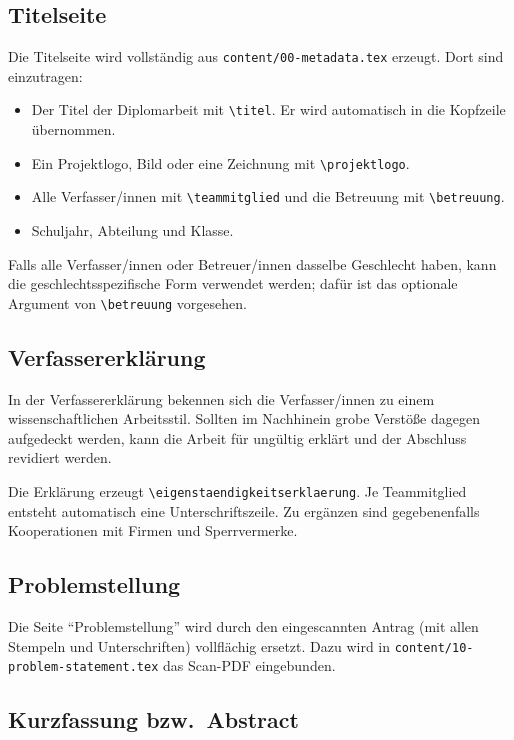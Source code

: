\subsection{Titelseite}

Die Titelseite wird vollständig aus \lstinline|content/00-metadata.tex| erzeugt. Dort
sind einzutragen:

\begin{itemize}
  \item Der Titel der Diplomarbeit mit \lstinline|\titel|. Er wird
        automatisch in die Kopfzeile übernommen.
  \item Ein Projektlogo, Bild oder eine Zeichnung mit
        \lstinline|\projektlogo|.
  \item Alle Verfasser/innen mit \lstinline|\teammitglied| und die
        Betreuung mit \lstinline|\betreuung|.
  \item Schuljahr, Abteilung und Klasse.
\end{itemize}

Falls alle Verfasser/innen oder Betreuer/innen dasselbe Geschlecht haben,
kann die geschlechtsspezifische Form verwendet werden; dafür ist das
optionale Argument von \lstinline|\betreuung| vorgesehen.

\subsection{Verfassererklärung}

In der Verfassererklärung bekennen sich die Verfasser/innen zu einem
wissenschaftlichen Arbeitsstil. Sollten im Nachhinein grobe Verstöße dagegen
aufgedeckt werden, kann die Arbeit für ungültig erklärt und der Abschluss
revidiert werden.

Die Erklärung erzeugt \lstinline|\eigenstaendigkeitserklaerung|. Je
Teammitglied entsteht automatisch eine Unterschriftszeile. Zu ergänzen sind
gegebenenfalls Kooperationen mit Firmen und Sperrvermerke.

\subsection{Problemstellung}

Die Seite \enquote{Problemstellung} wird durch den eingescannten Antrag (mit
allen Stempeln und Unterschriften) vollflächig ersetzt. Dazu wird in
\lstinline|content/10-problem-statement.tex| das Scan-PDF eingebunden.

\subsection{Kurzfassung bzw.\ Abstract}

